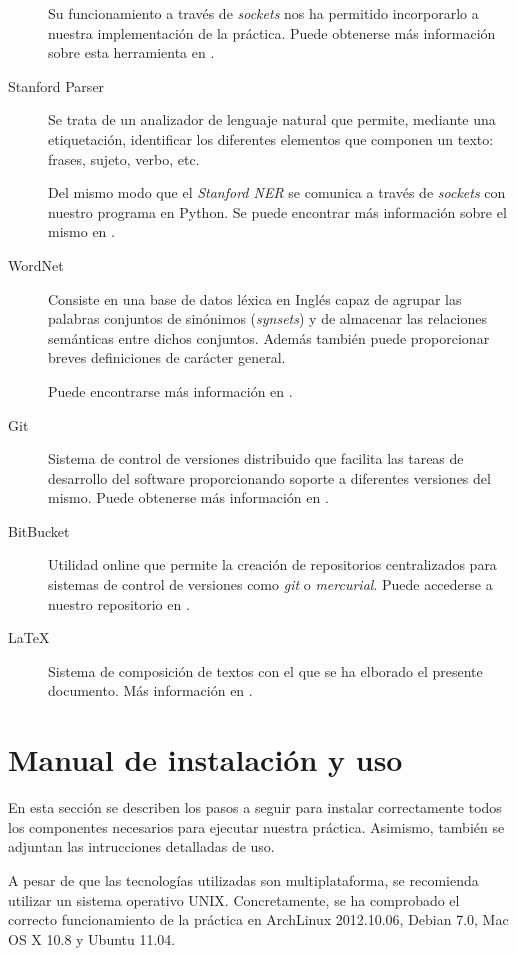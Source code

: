 \documentclass[12pt,a4paper,titlepage]{article}
\begin{document}
\begin{description}
Su funcionamiento a través de \emph{sockets} nos ha permitido incorporarlo a nuestra implementación de la práctica. Puede obtenerse más información sobre esta herramienta en \cite{stanford-ner}.

	\item[Stanford Parser] Se trata de un analizador de lenguaje natural que permite, mediante una etiquetación, identificar los diferentes elementos que componen un texto: frases, sujeto, verbo, etc.

	Del mismo modo que el \emph{Stanford NER} se comunica a través de \emph{sockets} con nuestro programa en Python. Se puede encontrar más información sobre el mismo en \cite{stanford-parser}.

	\item[WordNet] Consiste en una base de datos léxica en Inglés capaz de agrupar las palabras conjuntos de sinónimos (\emph{synsets}) y de almacenar las relaciones semánticas entre dichos conjuntos. Además también puede proporcionar breves definiciones de carácter general.

	Puede encontrarse más información en \cite{wordnet}.

	\item[Git] Sistema de control de versiones distribuido que facilita las tareas de desarrollo del software proporcionando soporte a diferentes versiones del mismo. Puede obtenerse más información en \cite{git}.

	\item[BitBucket] Utilidad online que permite la creación de repositorios centralizados para sistemas de control de versiones como \emph{git} o \emph{mercurial}. Puede accederse a nuestro repositorio en \cite{bitbucket}.

	\item[\LaTeX] Sistema de composición de textos con el que se ha elborado el presente documento. Más información en \cite{latex}.

\end{description}


\clearpage
\section{Manual de instalación y uso}
En esta sección se describen los pasos a seguir para instalar correctamente todos los componentes necesarios para ejecutar nuestra práctica. Asimismo, también se adjuntan las intrucciones detalladas de uso.

A pesar de que las tecnologías utilizadas son multiplataforma, se recomienda utilizar un sistema operativo UNIX. Concretamente, se ha comprobado el correcto funcionamiento de la práctica en ArchLinux 2012.10.06, Debian 7.0, Mac OS X 10.8 y Ubuntu 11.04.
\end{document}
